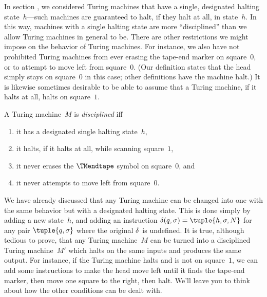 \documentclass[../../../include/open-logic-section]{subfiles}
\begin{document}

\begin{explain}
In section , we considered Turing machines that have a
single, designated halting state~$h$---such machines are guaranteed to
halt, if they halt at all, in state~$h$.  In this way, machines with a
single halting state are more ``disciplined'' than we allow Turing
machines in general to be.  There are other restrictions we might
impose on the behavior of Turing machines.  For instance, we also have
not prohibited Turing machines from ever erasing the tape-end marker
on square~$0$, or to attempt to move left from square~$0$. (Our
definition states that the head simply stays on square~$0$ in this
case; other definitions have the machine halt.) It is likewise
sometimes desirable to be able to assume that a Turing machine, if
it halts at all, halts on square~$1$.
\end{explain}

\begin{defn}
A Turing machine~$M$ is \emph{disciplined} iff
\begin{enumerate}
    \item it has a designated single halting state~$h$,
    \item it halts, if it halts at all, while scanning square~$1$,
    \item it never erases the $\TMendtape$ symbol on square~$0$, and
    \item it never attempts to move left from square~$0$.
\end{enumerate}
\end{defn}

\begin{explain}
We have already discussed that any Turing machine can be changed into
one with the same behavior but with a designated halting state. This is
done simply by adding a new state~$h$, and adding an instruction
$\delta(q, \sigma) = \tuple{h, \sigma, N}$ for any pair
$\tuple{q,\sigma}$ where the original $\delta$~is undefined.  It is
true, although tedious to prove, that any Turing machine~$M$ can be
turned into a disciplined Turing machine~$M'$ which halts on the same
inputs and produces the same output. For instance, if the Turing
machine halts and is not on square~$1$, we can add some instructions
to make the head move left until it finds the tape-end marker, then
move one square to the right, then halt.  We'll leave you to think
about how the other conditions can be dealt with.
\end{explain}
\end{document}

